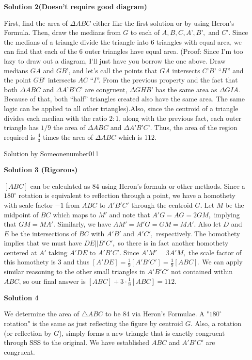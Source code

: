 \begin{enumerate}
 



\textbf{Solution 2(Doesn’t require good diagram)}

First, find the area of $\Delta ABC$ either like the first solution or by using Heron’s Formula. Then, draw the medians from $G$ to each of $A, B, C, A’, B’,$ and $C’$. Since the medians of a triangle divide the triangle into 6 triangles with equal area, we can find that each of the 6 outer triangles have equal area. (Proof: Since I’m too lazy to draw out a diagram, I’ll just have you borrow the one above. Draw medians $GA$ and $GB’$, and let’s call the points that $GA$ intersects $C’B’$ “$H$” and the point $GB’$ intersects $AC$ “$I$”. From the previous property and the fact that both $\Delta ABC$ and $\Delta A’B’C’$ are congruent, $\Delta GHB’$ has the same area as $\Delta GIA$. Because of that, both “half” triangles created also have the same area. The same logic can be applied to all other triangles).Also, since the centroid of a triangle divides each median with the ratio $2:1$, along with the previous fact, each outer triangle has $1/9$ the area of $\Delta ABC$ and $\Delta A’B’C’$. Thus, the area of the region required is $\frac{4}{3}$ times the area of $\Delta ABC$ which is $\boxed {112}$.

 Solution by Someonenumber011

 



\textbf{Solution 3 (Rigorous)}

$[ABC]$ can be calculated as 84 using Heron's formula or other methods. Since a $180^{\circ}$ rotation is equivalent to reflection through a point, we have a homothety with scale factor $-1$ from $ABC$ to $A'B'C'$ through the centroid $G$. Let $M$ be the midpoint of $BC$ which maps to $M'$ and note that $A'G=AG=2GM,$ implying that $GM=MA'.$ Similarly, we have $AM'=M'G=GM=MA'.$ Also let $D$ and $E$ be the intersections of $BC$ with $A'B'$ and $A'C',$ respectively. The homothety implies that we must have $DE || B'C',$ so there is in fact another homothety centered at $A'$ taking $A'DE$ to $A'B'C'$. Since $A'M'=3A'M,$ the scale factor of this homothety is 3 and thus $[A'DE]=\frac{1}{9}[A'B'C']=\frac{1}{9}[ABC].$ We can apply similar reasoning to the other small triangles in $A'B'C'$ not contained within $ABC$, so our final answer is $[ABC]+3\cdot\frac{1}{9}[ABC]=\boxed{112.}$




\textbf{Solution 4}

We determine the area of $\triangle ABC$ to be 84 via Heron's Formulae. A "$180^\circ$ rotation" is the same as just reflecting the figure by centroid $G$. Also, a rotation (or reflection by $G$), simply forms a new triangle that is exactly congruent through SSS to the original. We have established $ABC$ and $A'B'C'$ are congruent.


\end{enumerate}
